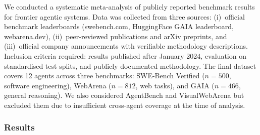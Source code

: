 \documentclass[review]{elsarticle}
\theoremstyle{definition}
\begin{document}
We conducted a systematic meta-analysis of publicly reported benchmark results for frontier agentic systems. Data was collected from three sources: (i)~official benchmark leaderboards (swebench.com, HuggingFace GAIA leaderboard, webarena.dev), (ii)~peer-reviewed publications and arXiv preprints, and (iii)~official company announcements with verifiable methodology descriptions. Inclusion criteria required: results published after January 2024, evaluation on standardised test splits, and publicly documented methodology. The final dataset covers 12 agents across three benchmarks: SWE-Bench Verified \citep{jimenez2024swebench} ($n=500$, software engineering), WebArena \citep{zhou2024webarena} ($n=812$, web tasks), and GAIA \citep{mialon2023gaia} ($n=466$, general reasoning). We also considered AgentBench \citep{liu2024agentbench} and VisualWebArena \citep{koh2024visualwebarena} but excluded them due to insufficient cross-agent coverage at the time of analysis.

\subsubsection{Results}
\end{document}

